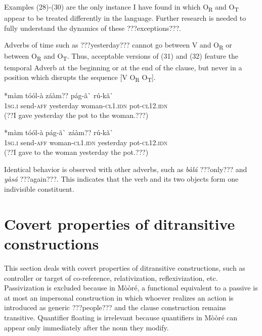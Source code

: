 \documentclass[output=paper]{langsci/langscibook}
\begin{document}
Examples (28){}-(30) are the only instance I have found in which O\textsubscript{R} and O\textsubscript{T} appear to be treated differently in the language. Further research is needed to fully understand the dynamics of these ???exceptions???.


Adverbs of time such as ???yesterday??? cannot go between V and O\textsubscript{R} or between O\textsubscript{R} and O\textsubscript{T}. Thus, acceptable versions of (31) and (32) feature the temporal Adverb at the beginning or at the end of the clause, but never in a position which disrupts the sequence [V O\textsubscript{R} O\textsubscript{T}].


\ea \gll 
\label{bkm:Ref424317802}*màm    tóól-à    záàm??    pág-ã\`{ }      rú-kã\`{ }
\\
%
\textsc{1sg.i  }    send-\textsc{aff}  yesterday  woman-\textsc{cl1.idn}  pot-\textsc{cl12.idn}
\\\glt
(??I gave yesterday the pot to the woman.???)
\z


\ea \gll 
\label{bkm:Ref424317812}*màm    tóól-à    pág-ã\`{ }      záàm??    rú-kã\`{ }
\\
%
\textsc{1sg.i  }    send-\textsc{aff}  woman\textsc{{}-cl1.idn}  yesterday  pot-\textsc{cl12.idn}
\\\glt
(??I gave to the woman yesterday the pot.???)
\z

Identical behavior is observed with other adverbs, such as \textit{bàlá} ???only??? and \textit{yàsá} ???again???. This indicates that the verb and its two objects form one indivisible constituent.

\section{Covert properties of ditransitive constructions }

This section deals with covert properties of ditransitive constructions, such as controller or target of co-reference, relativization, reflexivization, etc. Passivization is excluded because in Mòòré, a functional equivalent to a passive is at most an impersonal construction in which whoever realizes an action is introduced as generic ???people??? and the clause construction remains transitive. Quantifier floating is irrelevant because quantifiers in Mòòré can appear only immediately after the noun they modify. 
\end{document}
